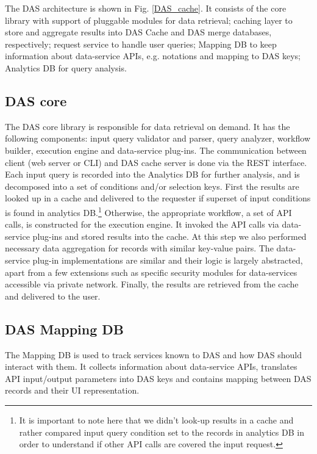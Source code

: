 \documentclass[1p,times]{elsarticle}
\begin{document}
The DAS architecture is shown in Fig. \ref{DAS_cache}. It consists of
the core library with support of pluggable modules for data retrieval;
caching layer to store and aggregate results into DAS Cache and DAS merge
databases, respectively;
request service to handle user queries;
Mapping DB to keep information about data-service APIs, e.g.
notations and mapping to DAS keys;
Analytics DB for query analysis.

\subsection{DAS core\label{DAS_core}}
The DAS core library is responsible for data retrieval on demand. 
It has the following components: input query validator and parser,
query analyzer, workflow builder, execution engine and data-service 
plug-ins. The communication between client (web server or CLI) and 
DAS cache server is done via the REST \cite{REST} interface. 
Each input query is recorded into the Analytics DB for further 
analysis, and is decomposed into a set of conditions and/or selection keys.
First the results are looked up in a cache and delivered to the requester
if superset of input conditions is found in analytics DB.\footnote{It is important
to note here that we didn't look-up results in a cache and rather
compared input query condition set to the records in analytics DB 
in order to understand if other API calls are covered the input request.}
Otherwise, the appropriate workflow, a set of API calls, is constructed
for the execution engine. It invoked the API calls via data-service
plug-ins and stored results into the cache. At this step we also
performed necessary data aggregation for records with similar key-value
pairs. The data-service plug-in implementations are similar and their 
logic is largely abstracted, apart from a few extensions such as specific
security modules for data-services accessible via private network.
Finally, the results are retrieved from the cache and delivered to the user. 

\subsection{DAS Mapping DB\label{MappingDB}}
The Mapping DB is used to track services known to DAS and how DAS should interact with them.
It collects
information about data-service APIs, translates API input/output
parameters into DAS keys and contains mapping between DAS records
and their UI representation.
\end{document}

